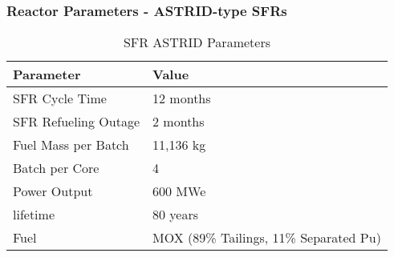 \begin{frame}
	\frametitle{Reactor Parameters - ASTRID-type SFRs}
	
\begin{table}[h]
	\centering
	\begin{tabularx}{\textwidth}{bb}
		\hline
		Parameter & Value \\
		\hline
		SFR Cycle Time & 12 months \\ 
		SFR Refueling Outage & 2 months \\
		Fuel Mass per Batch & 11,136 kg \\
		Batch per Core & 4 \\
		Power Output & 600 MWe \\
		lifetime & 80 years \\
		Fuel & {\small \gls{MOX} (89\% Tailings, 11\% Separated Pu)}\\
		\hline
	\end{tabularx}
	\caption {\gls{SFR} ASTRID Parameters \cite{marsaultmarie-sophie_pre-conceptual_2012}}
	\label{tab:sfr}
\end{table}
\end{frame}

	
	
	
	
		